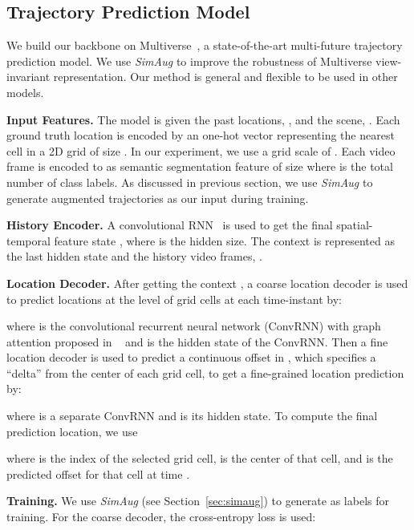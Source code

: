 \documentclass[runningheads]{eccv2020/llncs}
\newcommand{\fancyname}{SimAug}
\begin{document}
\subsection{Trajectory Prediction Model}
\label{sec:multiverse}

We build our backbone on Multiverse~\cite{liang2020garden}, a state-of-the-art multi-future trajectory prediction model. We use \emph{\fancyname} to improve the robustness of Multiverse 
view-invariant representation. Our method is general and flexible to be used in other models.

\noindent\textbf{Input Features.}
The model is given the past locations, , and the scene, . 
Each ground truth location  is encoded by an one-hot vector  representing the nearest cell in a 2D grid of size .
In our experiment, we use a grid scale of .
Each video frame  is encoded to as semantic segmentation feature of size  where  is the total number of class labels.
As discussed in previous section, we use \textit{\fancyname} to generate augmented trajectories  as our input during training.



\noindent\textbf{History Encoder.} 
A convolutional RNN~\cite{xingjian2015convolutional,wang2019eidetic} is used to get the final spatial-temporal feature state , where  is the hidden size.
The context is represented as the last hidden state and the history video frames, .

\noindent\textbf{Location Decoder.}
After getting the context , a coarse location decoder is used to predict locations at the level of grid cells at each time-instant by:

where  is the convolutional recurrent neural network (ConvRNN) with graph attention proposed in ~\cite{liang2020garden} and  is the hidden state of the ConvRNN.
Then a fine location decoder is used to predict a continuous offset in , which specifies a ``delta''
from the center of each grid cell, to get a fine-grained location prediction by:

where  is a separate ConvRNN and  is its hidden state.
To compute the final prediction location, we use

where  is the index of the selected grid cell,  is the center of that cell,
and  is the predicted offset for that cell at time .

\noindent\textbf{Training.} 
We use \textit{\fancyname} (see Section~\ref{sec:simaug}) to generate  as labels for training.
For the coarse decoder, the cross-entropy loss is used:
\end{document}
